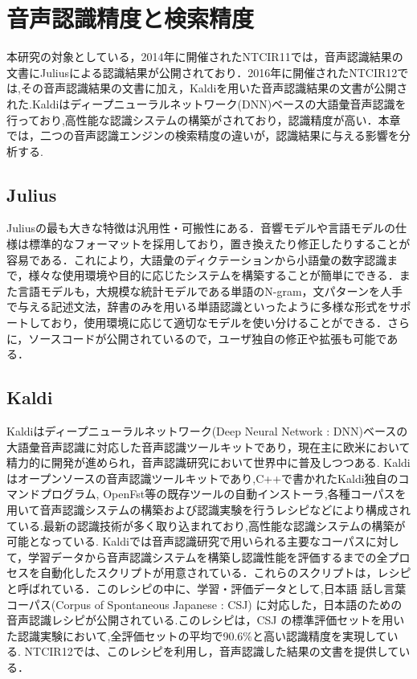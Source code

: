 \chapter{音声認識精度と検索精度}
本研究の対象としている，2014年に開催されたNTCIR11では，音声認識結果の文書にJulius\cite{julius}による認識結果が公開されており．2016年に開催されたNTCIR12では,その音声認識結果の文書に加え，Kaldiを用いた音声認識結果の文書が公開された.Kaldiはディープニューラルネットワーク(DNN)ベースの大語彙音声認識を行っており,高性能な認識システムの構築がされており，認識精度が高い．本章では，二つの音声認識エンジンの検索精度の違いが，認識結果に与える影響を分析する.


\section{Julius}
Juliusの最も大きな特徴は汎用性・可搬性にある．音響モデルや言語モデルの仕様は標準的なフォーマットを採用しており，置き換えたり修正したりすることが容易である．これにより，大語彙のディクテーションから小語彙の数字認識まで，様々な使用環境や目的に応じたシステムを構築することが簡単にできる．また言語モデルも，大規模な統計モデルである単語のN-gram，文パターンを人手で与える記述文法，辞書のみを用いる単語認識といったように多様な形式をサポートしており，使用環境に応じて適切なモデルを使い分けることができる．さらに，ソースコードが公開されているので，ユーザ独自の修正や拡張も可能である．

\section{Kaldi}
Kaldi\cite{kaldi}はディープニューラルネットワーク(Deep Neural Network : DNN)ベースの大語彙音声認識に対応した音声認識ツールキットであり，現在主に欧米において精力的に開発が進められ，音声認識研究において世界中に普及しつつある. Kaldiはオープンソースの音声認識ツールキットであり,C++で書かれたKaldi独自のコマンドプログラム, OpenFst等の既存ツールの自動インストーラ,各種コーパスを用いて音声認識システムの構築および認識実験を行うレシピなどにより構成されている.最新の認識技術が多く取り込まれており,高性能な認識システムの構築が可能となっている.
Kaldiでは音声認識研究で用いられる主要なコーパスに対して，学習データから音声認識システムを構築し認識性能を評価するまでの全プロセスを自動化したスクリプトが用意されている．これらのスクリプトは，レシピと呼ばれている．このレシピの中に、学習・評価データとして,日本語 話し言葉コーパス(Corpus of Spontaneous Japanese : CSJ) \cite{csj} に対応した，日本語のための音声認識レシピが公開されている.このレシピは，CSJ の標準評価セットを用いた認識実験において,全評価セットの平均で90.6\%と高い認識精度を実現している. NTCIR12では、このレシピを利用し，音声認識した結果の文書を提供している．

